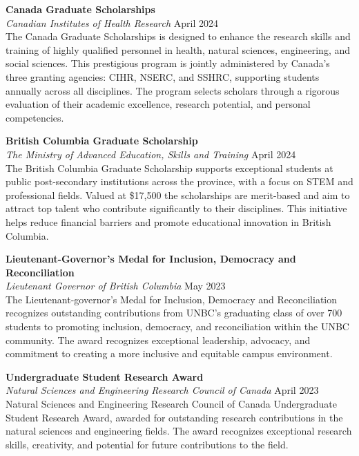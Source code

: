 \documentclass[11pt]{article}
\begin{document}
\vspace{8pt}

\noindent\textbf{Canada Graduate Scholarships} \\
\textit{Canadian Institutes of Health Research} \hfill April 2024 \\
The Canada Graduate Scholarships is designed to enhance the research skills and training of highly qualified personnel in health, natural sciences, engineering, and social sciences. This prestigious program is jointly administered by Canada's three granting agencies: CIHR, NSERC, and SSHRC, supporting students annually across all disciplines. The program selects scholars through a rigorous evaluation of their academic excellence, research potential, and personal competencies.

\vspace{8pt}

\noindent\textbf{British Columbia Graduate Scholarship} \\
\textit{The Ministry of Advanced Education, Skills and Training} \hfill April 2024 \\
The British Columbia Graduate Scholarship supports exceptional students at public post-secondary institutions across the province, with a focus on STEM and professional fields. Valued at \$17,500 the scholarships are merit-based and aim to attract top talent who contribute significantly to their disciplines. This initiative helps reduce financial barriers and promote educational innovation in British Columbia.

\vspace{8pt}

\noindent\textbf{Lieutenant-Governor's Medal for Inclusion, Democracy and Reconciliation} \\
\textit{Lieutenant Governor of British Columbia} \hfill May 2023 \\
The Lieutenant-governor's Medal for Inclusion, Democracy and Reconciliation recognizes outstanding contributions from UNBC's graduating class of over 700 students to promoting inclusion, democracy, and reconciliation within the UNBC community. The award recognizes exceptional leadership, advocacy, and commitment to creating a more inclusive and equitable campus environment.

\vspace{8pt}

\noindent\textbf{Undergraduate Student Research Award} \\
\textit{Natural Sciences and Engineering Research Council of Canada} \hfill April 2023 \\
Natural Sciences and Engineering Research Council of Canada Undergraduate Student Research Award, awarded for outstanding research contributions in the natural sciences and engineering fields. The award recognizes exceptional research skills, creativity, and potential for future contributions to the field.
\end{document}
